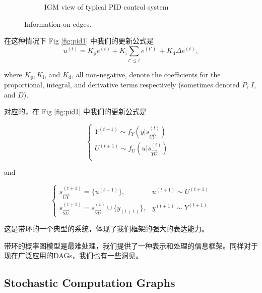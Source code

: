 \documentclass{article}
\theoremstyle{definition}
\theoremstyle{remark}
\theoremstyle{definition}
\begin{document}
\begin{CJK*}{UTF8}{gbsn}
\begin{figure}[h]
\begin{subfigure}[tb]{0.45\textwidth}
		\caption{IGM view of typical PID control system}
		\label{fig:pid2}
	\end{subfigure}\caption{Information on edges.}
\end{figure}

在这种情况下 Fig \ref{fig:pid1} 中我们的更新公式是
 $$
 u^{(t)}=K_{\text{p}} e^{(t)}+K_{\text{i}}\sum_{t'\leq t}e^{(t')}\, +K_{\text{d}} \Delta e^{(t)},
 $$

where $K_{\text{p}}, K_{\text{i}}$, and $K_{\text{d}}$, all non-negative, denote the coefficients for the proportional, integral, and derivative terms respectively (sometimes denoted $P$, $I$, and $D$).

对应的，在 Fig \ref{fig:pid1} 中我们的更新公式是


\begin{equation} \label{eq:evolve}
\left\{
     \begin{array}{lr}
     Y^{(t+1)} \sim f_Y(y|s_{\vec{UY}}^{(t)}) &  \\
     U^{(t+1)} \sim f_U(u|s_{\vec{YU}}^{(t)}) & \\
     \end{array}
\right.
\end{equation}

and 

\begin{equation} \label{eq:collect}
\left\{
     \begin{array}{lr}
     s^{(t+1)}_{\vec{UY}} = \{u^{(t+1)}\}, & u^{(t+1)} \sim U^{(t+1)} \\
     s^{(t+1)}_{\vec{YU}} = s^{(t)}_{\vec{YU}} \cup \{y_{(t+1)}\}, & y^{(t+1)} \sim Y^{(t+1)}  
     \end{array}
\right.
\end{equation}

这是带环的一个典型的系统，体现了我们框架的强大的表达能力。

带环的概率图模型是最难处理，我们提供了一种表示和处理的信息框架。同样对于现在广泛应用的DAGs，我们也有一些洞见。

\subsection{Stochastic Computation Graphs}


\end{CJK*}
\end{document}

